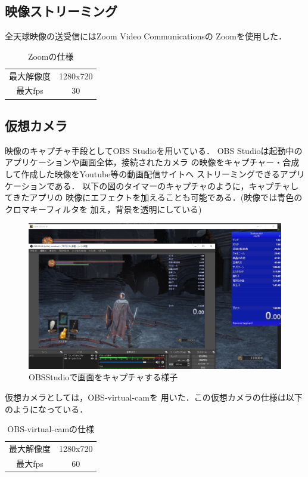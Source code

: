\subsection*{映像ストリーミング}
全天球映像の送受信にはZoom Video Communicationsの
Zoom\cite{1}を使用した．

\begin{table}[tp]
  \begin{center}
  \begin{tabular}{cc}
  最大解像度 & 1280x720 \\
  最大fps & 30      
  \end{tabular}
  \caption{Zoomの仕様}
  \end{center}
  \end{table}

\subsection*{仮想カメラ}
映像のキャプチャ手段としてOBS Studio\cite{9}を用いている．
OBS Studioは起動中のアプリケーションや画面全体，接続されたカメラ
の映像をキャプチャー・合成して作成した映像をYoutube等の動画配信サイトへ
ストリーミングできるアプリケーションである．
以下の図のタイマーのキャプチャのように，キャプチャしてきたアプリの
映像にエフェクトを加えることも可能である．(映像では青色のクロマキーフィルタを
加え，背景を透明にしている)

\begin{figure}[tp]
  \centering
  \includegraphics[scale=0.4]{fig/OBSstudio.png}
  \caption{OBSStudioで画面をキャプチャする様子}
\end{figure}

仮想カメラとしては，OBS-virtual-cam\cite{7}を
用いた．この仮想カメラの仕様は以下のようになっている．
 

\begin{table}[tp]
  \begin{center}
  \begin{tabular}{cc}
  最大解像度 & 1280x720 \\
  最大fps & 60      
  \end{tabular}
  \caption{OBS-virtual-camの仕様}
  \end{center}
  \end{table}

